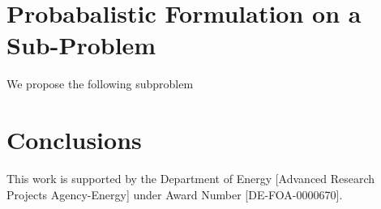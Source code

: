 \documentclass{article}
\begin{document}
\section{Probabalistic Formulation on a Sub-Problem}


We propose the following subproblem

%
%
%
\section{Conclusions}




%
%
\newpage
This work is supported by the Department of Energy [Advanced Research
Projects Agency-Energy] under Award Number [DE-FOA-0000670].   
\end{document}
